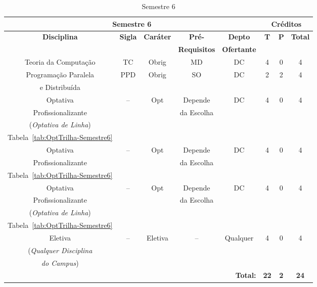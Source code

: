 
\begin{table}[H]
\caption{Semestre 6}
\centering
\footnotesize
\begin{tabular}{|c|c|c|c|c|c|c|c|} %
\hline
\hline
\multicolumn{5}{|c|}{\textbf{Semestre 6}}  &  \multicolumn{3}{|c|}{\textbf{Créditos}} \\
\hline
\hline
\textbf{Disciplina} & \textbf{Sigla} & \textbf{Caráter} & \textbf{Pré-} & \textbf{Depto} &  \textbf{T}  &  \textbf{P}  & \textbf{Total} \\ 
& & & \textbf{Requisitos}  & \textbf{Ofertante} & & & \\
\hline 
Teoria da Computação & TC & Obrig & MD & DC & 4 & 0 & 4 \\
\hline

Programação Paralela & PPD & Obrig & SO & DC & 2 & 2 & 4 \\
e Distribuída & & & & & & & \\
\hline


Optativa & --  & Opt & Depende & DC  & 4 & 0 & 4 \\
Profissionalizante & & & da Escolha & & & & \\
(\textit{Optativa de Linha}) & & & & & & & \\
Tabela~\ref{tab:OptTrilha-Semestre6} & & & & & & & \\
\hline

Optativa & --  & Opt & Depende & DC  & 4 & 0 & 4 \\
Profissionalizante & & & da Escolha & & & & \\
Tabela~\ref{tab:OptTrilha-Semestre6} & & & & & & & \\
\hline


Optativa & --  & Opt & Depende & DC  & 4 & 0 & 4 \\
Profissionalizante & & & da Escolha & & & & \\
(\textit{Optativa de Linha}) & & & & & & & \\
Tabela~\ref{tab:OptTrilha-Semestre6} & & & & & & & \\
\hline

Eletiva  & --  & Eletiva & -- & Qualquer & 4 & 0 & 4 \\
(\textit{Qualquer Disciplina} & & & & & & & \\
\textit{do Campus}) & & & & & & & \\
\hline




\hline


\hline
\hline
\multicolumn{5}{|r|}{\textbf{Total:}}  &  \textbf{22}  &  \textbf{2}   & \textbf{24} \\ %
\hline
\hline
\end{tabular}
\label{tab:matriz6}
\end{table}


